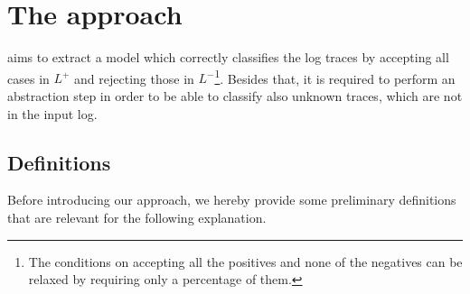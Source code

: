 
\section{The approach}
\label{sec:approach}

\nd aims to extract a model which correctly classifies the log traces by accepting all cases in $L^+$ and rejecting those in $L^-$\footnote{The conditions on accepting all the positives and none of the negatives can be relaxed by requiring only a percentage of them.}. Besides that, it is required to perform an abstraction step in order to be able to classify also unknown traces, which are not in the input log. %

\subsection{Definitions}
Before introducing our approach, we hereby provide some preliminary definitions that are relevant for the following explanation.




